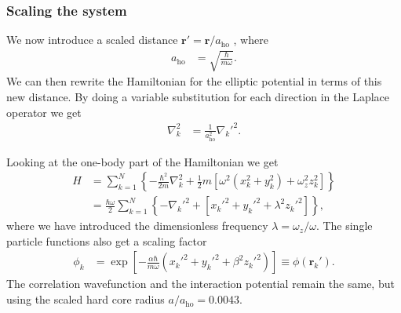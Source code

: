 \documentclass[
    a4paper, aps, twocolumn, floatfix, superscriptaddress,
    nofootinbib]{revtex4-1}
\newcommand{\vf}{\mathbf}
\newcommand{\1}{\mathds{1}}
\newcommand{\brak}[1]{\left[#1\right]}
\newcommand{\brac}[1]{\left\{#1\right\}}
\newcommand{\half}{\frac{1}{2}}
\begin{document}
        \subsubsection{Scaling the system}
            We now introduce a scaled distance $\vf{r}' = \vf{r}/a_{\text{ho}}$
            \cite{dubois2001bose}, where
            \begin{align}
                a_{\text{ho}}
                &=
                \sqrt{\frac{\hbar}{m\omega}}.
            \end{align}
            We can then rewrite the Hamiltonian for the elliptic potential in terms
            of this new distance. By doing a variable substitution for each
            direction in the Laplace operator we get
            \begin{align}
                \nabla_k^2
                &=
                \frac{1}{a_{\text{ho}}^2}{\nabla_k'}^2.
            \end{align}

            Looking at the one-body part of the Hamiltonian we get
            \begin{align}
                H
                &=
                \sum_{k = 1}^N
                \brac{
                    -\frac{\hbar^2}{2m}\nabla_k^2
                    + \half m\brak{
                        \omega^2(x_k^2 + y_k^2)
                        + \omega_z^2 z_k^2
                    }
                }
                \\
                &=
                \frac{\hbar\omega}{2}
                \sum_{k = 1}^N
                \brac{
                    -{\nabla_k'}^2
                    +
                    \brak{
                        {x_k'}^2 + {y_k'}^2 + \lambda^2{z_k'}^2
                    }
                },
                \label{eq:scaled_hamiltonian}
            \end{align}
            where we have introduced the dimensionless frequency $\lambda =
            \omega_z/\omega$. The single particle functions also get a scaling
            factor
            \begin{align}
                \phi_k
                &=
                \exp\brak{
                    -\frac{\alpha\hbar}{m\omega}
                    ({x_k'}^2 + {y_k'}^2 + \beta^2{z_k'}^2)
                }
                \equiv
                \phi(\vf{r}_k').
                \label{eq:scaled_spf}
            \end{align}
            The correlation wavefunction and the interaction potential remain the
            same, but using the scaled hard core radius $a/a_{\text{ho}} =
            0.0043$.
\end{document}
